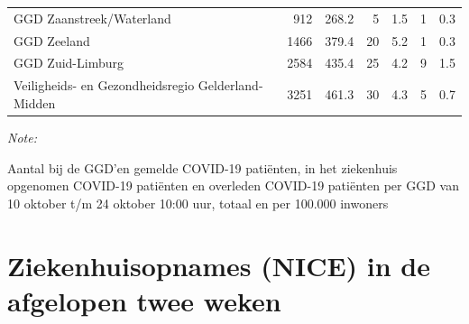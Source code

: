 \documentclass[
  english,
  man,floatsintext]{apa6}
\begin{document}
\begin{table}
\begin{threeparttable}
\begin{tabular}{lrrrrrr}
GGD Zaanstreek/Waterland & 912 & 268.2 & 5 & 1.5 & 1 & 0.3\\
GGD Zeeland & 1466 & 379.4 & 20 & 5.2 & 1 & 0.3\\
GGD Zuid-Limburg & 2584 & 435.4 & 25 & 4.2 & 9 & 1.5\\
Veiligheids- en Gezondheidsregio Gelderland-Midden & 3251 & 461.3 & 30 & 4.3 & 5 & 0.7\\
\bottomrule
\end{tabular}
\begin{tablenotes}
\item \textit{Note: } 
\item Aantal bij de GGD’en gemelde COVID-19 patiënten, in het ziekenhuis opgenomen COVID-19 patiënten en overleden COVID-19 patiënten per GGD van 10 oktober t/m 24 oktober 10:00 uur, totaal en per 100.000 inwoners
\end{tablenotes}
\end{threeparttable}
\endgroup{}
\end{table}

\newpage

\hypertarget{ziekenhuisopnames-nice-in-de-afgelopen-twee-weken}{%
\section{Ziekenhuisopnames (NICE) in de afgelopen twee weken}\label{ziekenhuisopnames-nice-in-de-afgelopen-twee-weken}}
\end{document}
